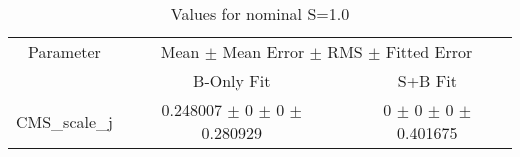 \begin{table}
\centering
\caption{Values for nominal S=1.0}
\begin{tabular}{ccc}
\toprule
Parameter & \multicolumn{2}{c}{Mean $\pm$ Mean Error $\pm$ RMS $\pm$ Fitted Error}\\
 & B-Only Fit & S+B Fit\\
\midrule
CMS\_scale\_j & \num{0.248007} $\pm$ \num{0} $\pm$ \num{0} $\pm$ \num{0.280929} & \num{0} $\pm$ \num{0} $\pm$ \num{0} $\pm$ \num{0.401675}\\
\bottomrule
\end{tabular}
\end{table}